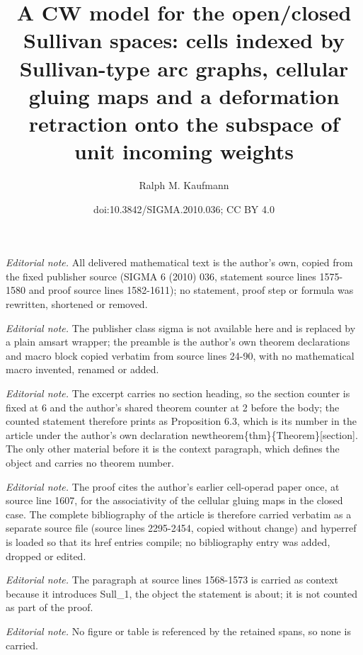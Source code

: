 \documentclass[10pt,a4paper]{amsart}
\title{A CW model for the open/closed Sullivan spaces: cells indexed by Sullivan-type arc graphs, cellular gluing maps and a deformation retraction onto the subspace of unit incoming weights}
\author{Ralph M. Kaufmann}
\date{doi:10.3842/SIGMA.2010.036; CC BY 4.0}
\begin{document}
\maketitle
\setcounter{section}{6}
\setcounter{thm}{2}
\noindent\textit{Editorial note.} All delivered mathematical text is the author's own, copied from the fixed publisher source (SIGMA 6 (2010) 036, statement source lines 1575-1580 and proof source lines 1582-1611); no statement, proof step or formula was rewritten, shortened or removed.\par\medskip
\noindent\textit{Editorial note.} The publisher class sigma is not available here and is replaced by a plain amsart wrapper; the preamble is the author's own theorem declarations and macro block copied verbatim from source lines 24-90, with no mathematical macro invented, renamed or added.\par\medskip
\noindent\textit{Editorial note.} The excerpt carries no section heading, so the section counter is fixed at 6 and the author's shared theorem counter at 2 before the body; the counted statement therefore prints as Proposition 6.3, which is its number in the article under the author's own declaration newtheorem\{thm\}\{Theorem\}[section]. The only other material before it is the context paragraph, which defines the object and carries no theorem number.\par\medskip
\noindent\textit{Editorial note.} The proof cites the author's earlier cell-operad paper once, at source line 1607, for the associativity of the cellular gluing maps in the closed case. The complete bibliography of the article is therefore carried verbatim as a separate source file (source lines 2295-2454, copied without change) and hyperref is loaded so that its href entries compile; no bibliography entry was added, dropped or edited.\par\medskip
\noindent\textit{Editorial note.} The paragraph at source lines 1568-1573 is carried as context because it introduces Sull\_1, the object the statement is about; it is not counted as part of the proof.\par\medskip
\noindent\textit{Editorial note.} No figure or table is referenced by the retained spans, so none is carried.\par\medskip
\end{document}

